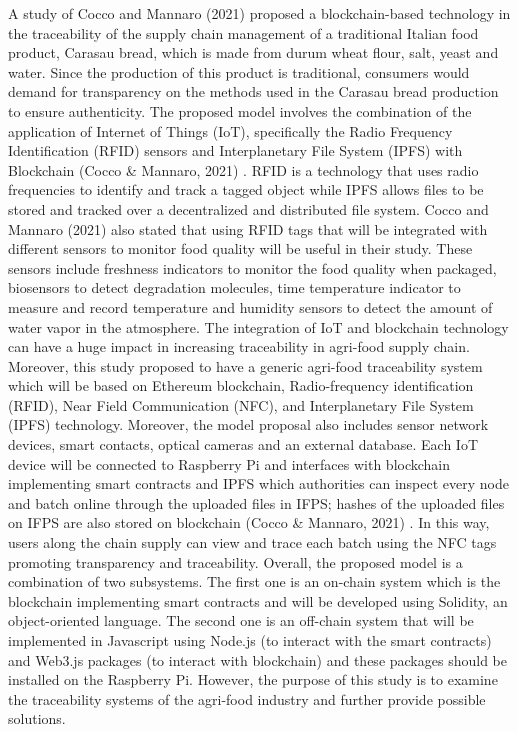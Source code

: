 A study of Cocco and Mannaro (2021) proposed a blockchain-based technology in the traceability of the supply chain management of a traditional Italian food product, Carasau bread, which is made from durum wheat flour, salt, yeast and water. Since the production of this product is traditional, consumers would demand for transparency on the methods used in the Carasau bread production to ensure authenticity. The proposed model involves the combination of the application of Internet of Things (IoT), specifically the Radio Frequency Identification (RFID) sensors and Interplanetary File System (IPFS) with Blockchain (Cocco \& Mannaro, 2021) \nocite{rrl-ETITSC3}. RFID is a technology that uses radio frequencies to identify and track a tagged object while IPFS allows files to be stored and tracked over a decentralized and distributed file system. Cocco and Mannaro (2021) also stated that using RFID tags that will be integrated with different sensors to monitor food quality will be useful in their study. These sensors include freshness indicators to monitor the food quality when packaged, biosensors to detect degradation molecules, time temperature indicator to measure and record temperature and humidity sensors to detect the amount of water vapor in the atmosphere. The integration of IoT and blockchain technology can have a huge impact in increasing traceability in agri-food supply chain. Moreover, this study proposed to have a generic agri-food traceability system which will be based on Ethereum blockchain, Radio-frequency identification (RFID), Near Field Communication (NFC), and Interplanetary File System (IPFS) technology. Moreover, the model proposal also includes sensor network devices, smart contacts, optical cameras and an external database. Each IoT device will be connected to Raspberry Pi and interfaces with blockchain implementing smart contracts and IPFS which authorities can inspect every node and batch online through the uploaded files in IFPS; hashes of the uploaded files on IFPS are also stored on blockchain (Cocco \& Mannaro, 2021) \nocite{rrl-ETITSC3}. In this way, users along the chain supply can view and trace each batch using the NFC tags promoting transparency and traceability. Overall, the proposed model is a combination of two subsystems. The first one is an on-chain system which is the blockchain implementing smart contracts and will be developed using Solidity, an object-oriented language. The second one is an off-chain system that will be implemented in Javascript using Node.js (to interact with the smart contracts) and Web3.js packages (to interact with blockchain) and these packages should be installed on the Raspberry Pi. However, the purpose of this study is to examine the traceability systems of the agri-food industry and further provide possible solutions. 

